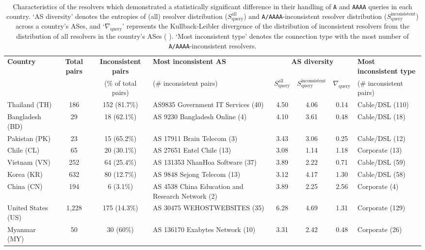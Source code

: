 \begin{table*}[t]
  \centering
  \small
  \scalebox{\tabularscale} {
    \begin{tabular}{lcclcccl}
    \toprule
      {\bf Country} & {\bf Total pairs} & {\bf Inconsistent pairs} & {\bf Most inconsistent AS} & \multicolumn{3}{c}{\bf AS diversity} & {\bf Most inconsistent type} \\ 
      & & {(\% of total pairs)}& {(\# inconsistent pairs)} & $S^{\text{all}}_{\text{query}}$ & $S^{\text{inconsistent}}_{\text{query}}$ & $\nabla_{\text{query}}$  & {(\# inconsistent pairs)} \\
      \midrule
      Thailand (TH)       & 186 & 152 (81.7\%)  &  AS9835 Government IT Services (40)  & 4.50 & 4.06 & 0.14 & Cable/DSL (110) \\
      Bangladesh (BD)     & 29  & 18 (62.1\%) & AS 9230 Bangladesh Online (4)          & 4.10 & 3.61 & 0.48 & Cable/DSL (18) \\    
      Pakistan (PK)       & 23  & 15 (65.2\%) & AS 17911 Brain Telecom (3)             & 3.43 & 3.06 & 0.25 & Cable/DSL (12) \\    
      Chile (CL)          & 65  & 20 (30.1\%) & AS 27651 Entel Chile (13)              & 3.08 & 1.14 & 1.18 & Corporate (13) \\    
      Vietnam (VN)        & 252 & 64 (25.4\%) & AS 131353 NhanHoa Software (37)        & 3.89 & 2.22 & 0.71 & Cable/DSL (59) \\    
      Korea (KR)          & 632 & 80 (12.7\%) & AS 9848 Sejong Telecom (13)            & 3.12 & 4.17 & 1.30 & Cable/DSL (58) \\    
      China (CN)          & 194 & 6 (3.1\%)   & AS 4538 China Education and Research Network (2) & 3.89 & 2.25 & 2.56 & Corporate (4)   \\    
    \midrule
      United States (US)  & 1,228 & 175 (14.3\%)  & AS 30475 WEHOSTWEBSITES (35) & 6.28 & 4.69 & 1.31 & Corporate (129) \\    
      Myanmar (MY)        & 50  & 30 (60\%)   & AS 136170 Exabytes Network (10)  & 3.31 & 2.42 & 0.48 & Corporate (26) \\    
    \bottomrule
  \end{tabular}
  }
  \caption{Characteristics of the resolvers which demonstrated a statistically
  significant difference in their handling of {\tt A} and {\tt AAAA} queries in
  each country. 
  `AS diversity' denotes the entropies of (all) resolver distribution
  ($S^{\text{all}}_{\text{query}}$) and {\tt A/AAAA}-inconsistent resolver
  distribution ($S^{\text{inconsistent}}_{\text{query}}$) across a country's
  ASes, and `$\nabla_{\text{query}}$' represents the Kullback-Leibler
  divergence of the distribution of inconsistent resolvers from the
  distribution of all resolvers in the country's ASes (\cf
  ).
  `Most inconsistent type' denotes the connection type with the most number of
  {\tt A/AAAA}-inconsistent resolvers.}
  \label{tab:resources:resolvers}
\end{table*}

